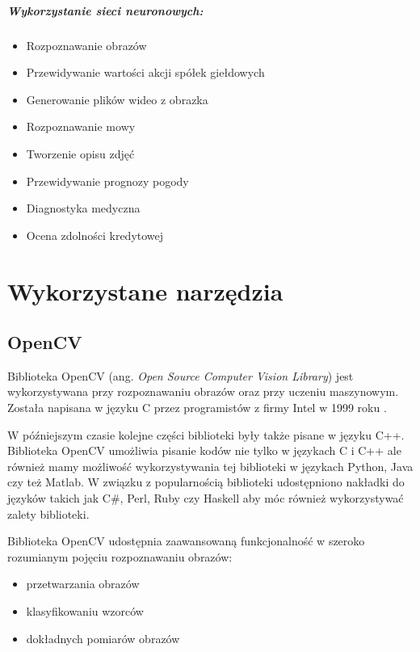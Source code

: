 \documentclass[a4paper,12pt,twoside,openany]{report}
\begin{document}
\paragraph{Wykorzystanie sieci neuronowych:}
\begin{itemize}
	\item Rozpoznawanie obrazów
	\item Przewidywanie wartości akcji spółek giełdowych
	\item Generowanie plików wideo z obrazka
	\item Rozpoznawanie mowy
	\item Tworzenie opisu zdjęć
	\item Przewidywanie prognozy pogody
	\item Diagnostyka medyczna
	\item Ocena zdolności kredytowej
\end{itemize}

\chapter{Wykorzystane narzędzia}

\section{OpenCV}
Biblioteka OpenCV (ang.\textit{ Open Source Computer Vision Library}) jest wykorzystywana przy rozpoznawaniu obrazów oraz przy uczeniu maszynowym. Została napisana w języku C przez programistów z firmy Intel w 1999 roku \cite{opencv}.

W późniejszym czasie kolejne części biblioteki były także pisane w języku C++. Biblioteka OpenCV umożliwia pisanie kodów nie tylko w językach C i C++ ale również mamy możliwość wykorzystywania tej biblioteki w językach Python, Java czy też Matlab. W związku z popularnością biblioteki udostępniono nakładki do języków takich jak C\#, Perl, Ruby czy Haskell aby móc również wykorzystywać zalety  biblioteki\cite{opencv2}. 

Biblioteka OpenCV udostępnia zaawansowaną funkcjonalność  w szeroko rozumianym pojęciu rozpoznawaniu obrazów:

\begin{itemize}
	\item przetwarzania obrazów
	\item klasyfikowaniu wzorców
	\item dokładnych pomiarów obrazów
\end{itemize}
\end{document}
